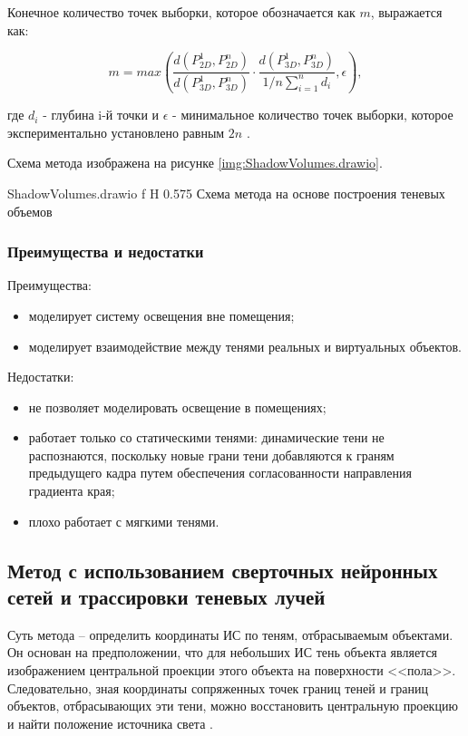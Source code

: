 Конечное количество точек выборки, которое обозначается как $m$, выражается как:

\begin{equation}
	m = max(\frac{d(P_{2D}^1, P_{2D}^n)}{d(P_{3D}^1, P_{3D}^n)} \cdot \frac{d(P_{3D}^1, P_{3D}^n)}{1/n \sum_{i=1}^{n} d_i}, \epsilon),
\end{equation}

где $d_i$ - глубина i-й точки и $\epsilon$ - минимальное количество точек выборки, которое экспериментально установлено равным $2n$ \cite{wei2019simulating}.

Схема метода изображена на рисунке \ref{img:ShadowVolumes.drawio}.

	{ShadowVolumes.drawio}
	{f}
	{H}
	{0.575\textwidth}
	{Схема метода на основе построения теневых объемов}

\subsubsection*{Преимущества и недостатки}

Преимущества:
\begin{itemize}
	\item моделирует систему освещения вне помещения;
	\item моделирует взаимодействие между тенями реальных и виртуальных объектов.
\end{itemize}


Недостатки:
\begin{itemize}
	\item не позволяет моделировать освещение в помещениях;
	\item работает только со статическими тенями: динамические тени не распознаются, поскольку новые грани тени добавляются к граням предыдущего кадра путем обеспечения согласованности направления градиента края;
	\item плохо работает с мягкими тенями.
\end{itemize}


\subsection{Метод с использованием сверточных нейронных сетей и трассировки теневых лучей}

Суть метода -- определить координаты ИС по теням, отбрасываемым объектами. Он основан на предположении, что для небольших ИС тень объекта является изображением центральной проекции этого объекта на поверхности <<пола>>. Следовательно, зная координаты сопряженных точек границ теней и границ объектов, отбрасывающих эти тени, можно восстановить центральную проекцию и найти положение источника света \cite{sns_tras}.

